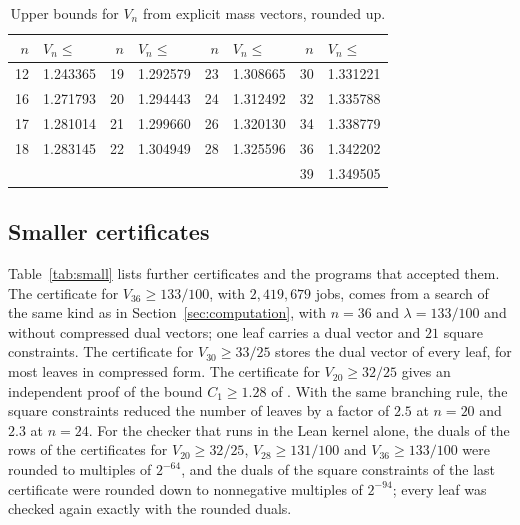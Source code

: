 \documentclass[11pt]{amsart}
\theoremstyle{definition}
\theoremstyle{remark}
\numberwithin{equation}{section}
\newcommand{\NjobsB}{2{,}419{,}679}
\begin{document}
\begin{table}[ht]
\centering
\caption{Upper bounds for $V_n$ from explicit mass vectors, rounded up.}\label{tab:Vn}
\begin{tabular}{@{}rlrlrlrl@{}}
\toprule
$n$ & $V_n\le$ & $n$ & $V_n\le$ & $n$ & $V_n\le$ & $n$ & $V_n\le$\\
\midrule
12 & 1.243365 & 19 & 1.292579 & 23 & 1.308665 & 30 & 1.331221\\
16 & 1.271793 & 20 & 1.294443 & 24 & 1.312492 & 32 & 1.335788\\
17 & 1.281014 & 21 & 1.299660 & 26 & 1.320130 & 34 & 1.338779\\
18 & 1.283145 & 22 & 1.304949 & 28 & 1.325596 & 36 & 1.342202\\
 & & & & & & 39 & 1.349505\\
\bottomrule
\end{tabular}
\end{table}

\subsection*{Smaller certificates} Table~\ref{tab:small} lists further certificates and the programs that accepted them. The certificate for $V_{36}\ge133/100$, with $\NjobsB$ jobs, comes from a search of the same kind as in Section~\ref{sec:computation}, with $n=36$ and $\lambda=133/100$ and without compressed dual vectors; one leaf carries a dual vector and $21$ square constraints. The certificate for $V_{30}\ge33/25$ stores the dual vector of every leaf, for most leaves in compressed form. The certificate for $V_{20}\ge32/25$ gives an independent proof of the bound $C_1\ge1.28$ of \cite{CS17}. With the same branching rule, the square constraints reduced the number of leaves by a factor of $2.5$ at $n=20$ and $2.3$ at $n=24$. For the checker that runs in the Lean kernel alone, the duals of the rows of the certificates for $V_{20}\ge32/25$, $V_{28}\ge131/100$ and $V_{36}\ge133/100$ were rounded to multiples of $2^{-64}$, and the duals of the square constraints of the last certificate were rounded down to nonnegative multiples of $2^{-94}$; every leaf was checked again exactly with the rounded duals.
\end{document}
